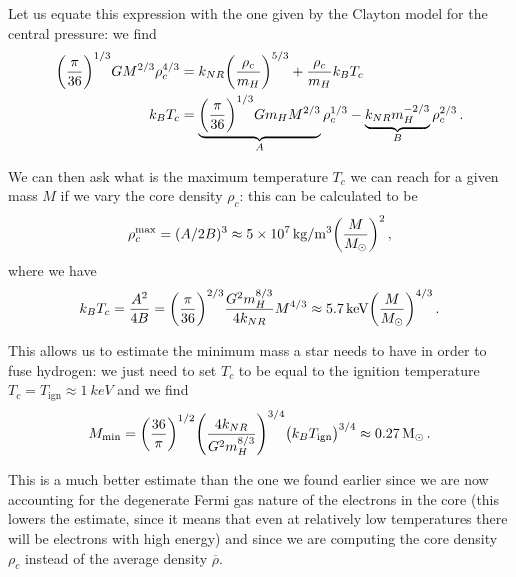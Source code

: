 \documentclass[main.tex]{subfiles}
\begin{document}
Let us equate this expression with the one given by the Clayton model for the central pressure: we find
%
\begin{align}
  \qty(\frac{\pi}{36})^{1/3} G M^{2/3} \rho_{c}^{4/3}
  &= k_{NR} \qty(\frac{\rho_c}{m_{H}})^{5/3} + \frac{\rho_{c}}{m_H} k_B T_c \\
  k_B T_c &= \underbrace{\qty(\frac{\pi}{36})^{1/3} G m_{H} M^{2/3}}_{A} \rho_{c}^{1/3} - \underbrace{k_{NR} m_H^{-2/3}}_{B} \rho _c^{2/3}
\,.
\end{align}
%

We can then ask what is the maximum temperature \(T_c\) we can reach for a given mass \(M\) if we vary the core density \(\rho _c\):
this can be calculated to be 
%
\begin{align}
\rho_{c}^{\text{max}} = (A/ 2B)^{3} \approx \SI{5e7}{kg/m^3} \qty( \frac{M}{M_{\odot}})^2
\,,
\end{align}
%
where we have 
%
\begin{align}
  k_B T_c = \frac{A^2}{4B} = \qty(\frac{\pi }{36})^{2/3} \frac{G^2m_H^{8/3}}{4 k_{NR}} M^{4/3}
  \approx \SI{5.7}{keV} \qty( \frac{M}{M_{\odot}})^{4/3}
\,.
\end{align}

This allows us to estimate the minimum mass a star needs to have in order to fuse hydrogen: we just need to set \(T_c\) to be equal to the ignition temperature \(T_c = T _{\text{ign}} \approx \SI{1}{keV}\) and we find
%
\begin{align}
  M _{\text{min}} = 
  \qty(\frac{36}{\pi })^{1/2} 
  \qty(\frac{4 k_{NR}}{G^2m_H^{8/3}})^{3/4}
  \qty(k_B T _{\text{ign}})^{3/4}
  \approx \SI{.27}{M_{\odot}}
\,.
\end{align}

This is a much better estimate than the one we found earlier since we are now accounting for the degenerate Fermi gas nature of the electrons in the core (this lowers the estimate, since it means that even at relatively low temperatures there will be electrons with high energy) and since we are computing the core density \(\rho _c\) instead of the average density \(\overline{\rho}\). 

\end{document}

